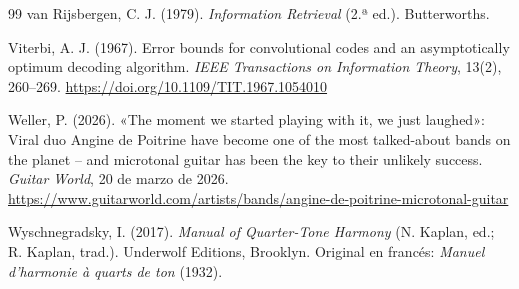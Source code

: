 \begin{thebibliography}{99}
van Rijsbergen, C. J. (1979). \emph{Information Retrieval} (2.ª ed.). Butterworths.

Viterbi, A. J. (1967). Error bounds for convolutional codes and an asymptotically optimum decoding algorithm.
\emph{IEEE Transactions on Information Theory}, 13(2), 260--269. \url{https://doi.org/10.1109/TIT.1967.1054010}

Weller, P. (2026). «The moment we started playing with it, we just laughed»: Viral duo Angine de Poitrine have become one
of the most talked-about bands on the planet -- and microtonal guitar has been the key to their unlikely success.
\emph{Guitar World}, 20 de marzo de 2026. \url{https://www.guitarworld.com/artists/bands/angine-de-poitrine-microtonal-guitar}

Wyschnegradsky, I. (2017). \emph{Manual of Quarter-Tone Harmony} (N. Kaplan, ed.; R. Kaplan, trad.). Underwolf
Editions, Brooklyn. Original en francés: \emph{Manuel d'harmonie à quarts de ton} (1932).

\end{thebibliography}

